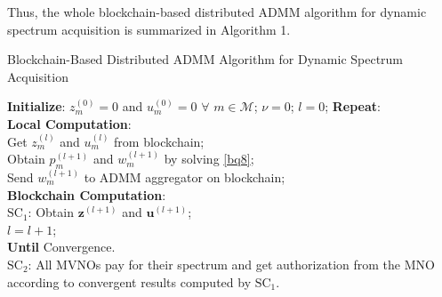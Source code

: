 \documentclass[journal]{IEEEtran}
\begin{document}
Thus, the whole blockchain-based distributed ADMM algorithm for dynamic spectrum acquisition is summarized in Algorithm 1.

\begin{algorithm}[h]
\caption{Blockchain-Based Distributed ADMM Algorithm for Dynamic Spectrum Acquisition}
\begin{algorithmic}[1]
\STATE \textbf{Initialize}: $z_m^{(0)}=0$ and $u_m^{(0)}=0$ $\forall$ $m\in\mathcal{M}$; $\nu=0$; $l=0$;
\STATE \textbf{Repeat}: \\
\hspace{0.5cm} \textbf{Local Computation}:\\
\hspace{1.0cm} Get $z_m^{(l)}$ and $u_m^{(l)}$ from blockchain;\\
\hspace{1.0cm} Obtain $p_m^{(l+1)}$ and $w_m^{(l+1)}$ by solving \eqref{bq8}; \\
\hspace{1.0cm} Send $w_m^{(l+1)}$ to ADMM aggregator on blockchain;\\
\hspace{0.5cm} \textbf{Blockchain Computation}:\\
\hspace{1.0cm} {\color{red}$\mbox{SC}_1$:} Obtain $\mathbf{z}^{(l+1)}$ and $\mathbf{u}^{(l+1)}$; \\
\hspace{0.5cm} $l=l+1$;\\
\textbf{Until} Convergence.\\
{\color{red} \STATE $\mbox{SC}_2$: All MVNOs pay for their spectrum and get authorization from the MNO according to convergent results computed by $\mbox{SC}_1$.} \\

\end{algorithmic}
\end{algorithm}
\end{document}
